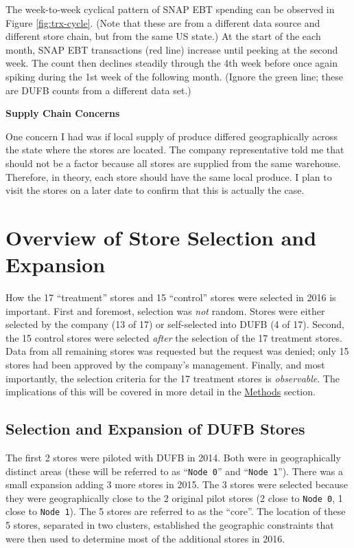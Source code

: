 \documentclass[12pt,letterpaperpaper,]{book}
\begin{document}
The week-to-week cyclical pattern of SNAP EBT spending can be observed
in Figure \ref{fig:trx-cycle}. (Note that these are from a different
data source and different store chain, but from the same US state.) At
the start of the each month, SNAP EBT transactions (red line) increase
until peeking at the second week. The count then declines steadily
through the 4th week before once again spiking during the 1st week of
the following month. (Ignore the green line; these are DUFB counts from
a different data set.)

\textbf{Supply Chain Concerns}

One concern I had was if local supply of produce differed geographically
across the state where the stores are located. The company
representative told me that should not be a factor because all stores
are supplied from the same warehouse. Therefore, in theory, each store
should have the same local produce. I plan to visit the stores on a
later date to confirm that this is actually the case.

\hypertarget{store-selection-1}{\section*{Overview of Store Selection
and Expansion}\label{store-selection-1}}

How the 17 ``treatment'' stores and 15 ``control'' stores were selected
in 2016 is important. First and foremost, selection was \emph{not}
random. Stores were either selected by the company (13 of 17) or
self-selected into DUFB (4 of 17). Second, the 15 control stores were
selected \emph{after} the selection of the 17 treatment stores. Data
from all remaining stores was requested but the request was denied; only
15 stores had been approved by the company's management. Finally, and
most importantly, the selection criteria for the 17 treatment stores is
\emph{observable}. The implications of this will be covered in more
detail in the \protect\hyperlink{methods}{Methods} section.

\subsection*{Selection and Expansion of DUFB
Stores}\label{selection-and-expansion-of-dufb-stores}

The first 2 stores were piloted with DUFB in 2014. Both were in
geographically distinct areas (these will be referred to as
``\texttt{Node\ 0}'' and ``\texttt{Node\ 1}''). There was a small
expansion adding 3 more stores in 2015. The 3 stores were selected
because they were geographically close to the 2 original pilot stores (2
close to \texttt{Node\ 0}, 1 close to \texttt{Node\ 1}). The 5 stores
are referred to as the ``core''. The location of these 5 stores,
separated in two clusters, established the geographic constraints that
were then used to determine most of the additional stores in 2016.
\end{document}
